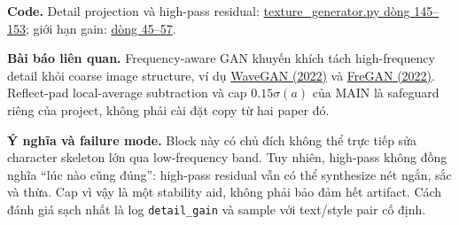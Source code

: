 \documentclass[10pt,a4paper]{article}
\newcommand{\paper}[2]{\href{#1}{#2}}
\begin{document}
\textbf{Code.} Detail projection và high-pass residual: \href{https://github.com/rquq/HGGAN_test/blob/main/networks/texture_generator.py\#L145-L153}{texture\_generator.py dòng 145--153}; giới hạn gain: \href{https://github.com/rquq/HGGAN_test/blob/main/networks/texture_generator.py\#L45-L57}{dòng 45--57}.

\textbf{Bài báo liên quan.} Frequency-aware GAN khuyến khích tách high-frequency detail khỏi coarse image structure, ví dụ \paper{https://arxiv.org/abs/2207.07288}{WaveGAN (2022)} và \paper{https://arxiv.org/abs/2210.05461}{FreGAN (2022)}. Reflect-pad local-average subtraction và cap $0.15\sigma(a)$ của MAIN là safeguard riêng của project, không phải cài đặt copy từ hai paper đó.

\begin{center}
\end{center}

\textbf{Ý nghĩa và failure mode.} Block này có chủ đích không thể trực tiếp sửa character skeleton lớn qua low-frequency band. Tuy nhiên, high-pass không đồng nghĩa ``lúc nào cũng đúng'': high-pass residual vẫn có thể synthesize nét ngắn, sắc và thừa. Cap vì vậy là một stability aid, không phải bảo đảm hết artifact. Cách đánh giá sạch nhất là log \texttt{detail\_gain} và sample với text/style pair cố định.
\end{document}
